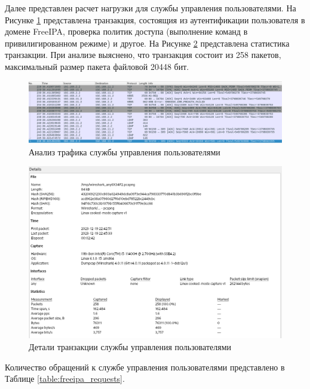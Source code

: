 \documentclass[14pt, a4paper]{extarticle}
\numberwithin{equation}{section}
\begin{document}
Далее представлен расчет нагрузки для службы управления пользователями.
На Рисунке \ref{fig:wireshark_freeipa_dump} представлена транзакция, состоящия из аутентификации пользователя в домене
FreeIPA, проверка политик доступа (выполнение команд в привилигированном режиме) и другое.
На Рисунке \ref{fig:wireshark_freeipa_stats_dump} представлена статистика транзакции. При анализе выяснено, что транзакция состоит
из 258 пакетов, максимальный размер пакета файловой 20448 бит.

\begin{figure}[H]
        \centering
        \includegraphics[scale=0.5]{freeipa_wireshark.png}
        \caption{Анализ трафика службы управления пользователями}
        \label{fig:wireshark_freeipa_dump}
\end{figure}
\begin{figure}[H]
        \centering
        \includegraphics[scale=0.7]{freeipa_wireshark_stats.png}
        \caption{Детали транзакции службы управления пользователями}
        \label{fig:wireshark_freeipa_stats_dump}
\end{figure}

Количество обращений к службе управления пользователями представлено в Таблице \ref{table:freeipa_requests}.
\end{document}
